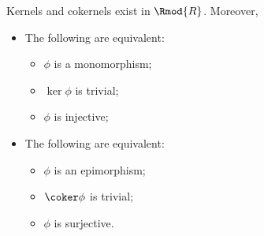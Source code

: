 \begin{proposition}\label{prp:3.6.2}
	Kernels and cokernels exist in $\Rmod{R} $. Moreover,
	\begin{itemize}
		\item The following are equivalent:
			\begin{itemize}
				\item $\phi $ is a monomorphism;
				\item $\ker \phi $ is trivial;
				\item $\phi $ is injective;
			\end{itemize}
		\item The following are equivalent:
			\begin{itemize}
				\item $\phi $ is an epimorphism;
				\item $\coker \phi $ is trivial;
				\item $\phi $ is surjective.
			\end{itemize}
	\end{itemize}
\end{proposition}
